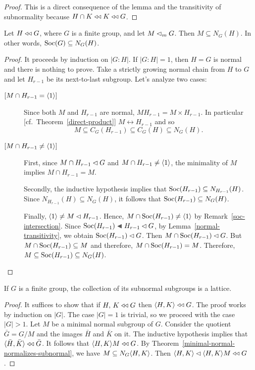 \begin{proof} This is a direct consequence of the lemma and the transitivity of subnormality because $H\cap K\mathrel{\triangleleft\triangleleft} K\mathrel{\triangleleft\triangleleft} G$.  \end{proof}


\begin{thm}\label{minimal-normal-normalizes-subnormal}
    Let\/ $H\mathrel{\triangleleft\triangleleft} G$, where\/ $G$ is a finite group, and let $M\lhd_mG$. Then $M \subseteq N_G(H)$. In other words, ${\rm Soc}(G)\subseteq N_G(H)$.
\end{thm}

\begin{proof} It proceeds by induction on $|G:H|$. If $|G:H|=1$, then $H=G$ is normal and there is nothing to prove. Take a strictly growing normal chain from $H$ to $G$ and let $H_{r-1}$ be its next-to-last subgroup. Let's analyze two cases:
\begin{description}
    \item[\small${[}M\cap H_{r-1}=\langle1\rangle{]}$] Since both $M$ and $H_{r-1}$ are normal, $MH_{r-1}=M\times H_{r-1}$. In particular [cf.~Theorem~\ref{direct-product}] $M\leftrightarrow H_{r-1}$ and so
    $$
        M \subseteq C_G(H_{r-1})\subseteq C_G(H) \subseteq N_G(H).
    $$
    
    \item[\small${[}M\cap H_{r-1}\ne\langle1\rangle{]}$] First, since $M\cap H_{r-1}\lhd G$ and $M\cap H_{r-1}\ne\langle1\rangle$, the minimality of $M$ implies $M\cap H_{r-1}=M$.
    
    Secondly, the inductive hypothesis implies that ${\rm Soc}(H_{r-1})\subseteq N_{H_{r-1}}(H)$. Since $N_{H_{r-1}}(H)\subseteq N_G(H)$, it follows that ${\rm Soc}(H_{r-1})\subseteq N_G(H)$.
    
    Finally, $\langle1\rangle\ne M\lhd H_{r-1}$. Hence, $M\cap{\rm Soc}(H_{r-1})\ne\langle1\rangle$ by Remark~\ref{soc-intersection}. Since $\Soc(H_{r-1})\ch H_{r-1}\normal G$, by Lemma~\ref{normal-transitivity}, we obtain ${\rm Soc}(H_{r-1})\lhd G$. Then $M\cap{\rm Soc}(H_{r-1})\lhd G$. But $M\cap{\rm Soc}(H_{r-1})\subseteq M$ and therefore, $M\cap{\rm Soc}(H_{r-1})=M$. Therefore, $M \subseteq {\rm Soc}(H_{r-1})\subseteq N_G(H)$.
\end{description}
\end{proof}

\begin{thm}\label{subnormal-lattice}
    If\/ $G$ is a finite group, the collection of its subnormal subgroups is a lattice.
\end{thm}

\begin{proof} It suffices to show that if $H,\,K \mathrel{\triangleleft\triangleleft} G$ then\/ $\langle H,K\rangle \mathrel{\triangleleft\triangleleft} G$. The proof works by induction on $|G|$. The case $|G|=1$ is trivial, so we proceed with the case $|G|>1$. Let $M$ be a minimal normal subgroup of $G$. Consider the quotient $\bar G=G/M$ and the images $\bar H$ and $\bar K$ on it. The inductive hypothesis implies that $\langle\bar H,\bar K\rangle\mathrel{\triangleleft\triangleleft}\bar G$. It follows that $\langle H,K\rangle M\mathrel{\triangleleft\triangleleft} G$. By Theorem~\ref{minimal-normal-normalizes-subnormal}, we have $M\subseteq N_G\langle H,K\rangle$. Then $\langle H,K\rangle\lhd \langle H,K\rangle M\mathrel{\triangleleft\triangleleft} G$.  \end{proof}

